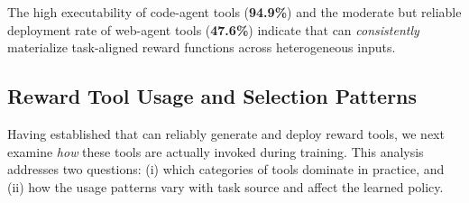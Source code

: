 The high executability of code-agent tools (\textbf{94.9\%}) and the moderate but reliable deployment rate of web-agent tools (\textbf{47.6\%}) indicate that \method{} can \emph{consistently} materialize task-aligned reward functions across heterogeneous inputs.




\subsection{Reward Tool Usage and Selection Patterns} \label{sec:reward_tool_usage}
Having established that \method{} can reliably generate and deploy reward tools, we next examine \emph{how} these tools are actually invoked during training.
This analysis addresses two questions: (i) which categories of tools dominate in practice, and (ii) how the usage patterns vary with task source and affect the learned policy.



